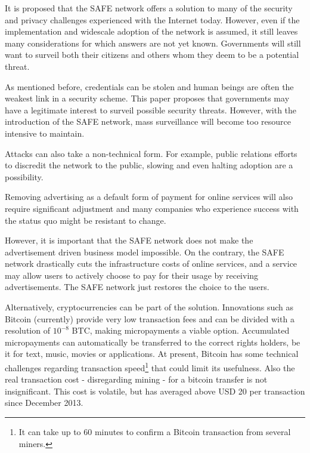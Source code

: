\documentclass[twocolumn,english]{article}
\begin{document}
It is proposed that the SAFE network offers a solution to many of
the security and privacy challenges experienced with the Internet
today. However, even if the implementation and widescale adoption
of the network is assumed, it still leaves many considerations for
which answers are not yet known. Governments will still want to surveil
both their citizens and others whom they deem to be a potential threat.

As mentioned before, credentials can be stolen and human beings are often the weakest link in a security scheme.  This paper proposes that governments may have a legitimate interest to surveil possible security threats.  However, with the introduction of the SAFE network, mass surveillance will become too resource intensive to maintain.

Attacks can also take a non-technical
form. For example, public relations efforts to discredit the network
to the public, slowing and even halting adoption are a possibility.

Removing advertising as a default form of payment for online services will
also require significant adjustment and many companies who experience success with the status quo might be resistant to
change.

However, it is important that the SAFE network does not make the advertisement driven business model impossible.  On the contrary, the SAFE network drastically cuts the infrastructure costs of online services, and a service may allow users to actively choose to pay for their usage by receiving advertisements.  The SAFE network just restores the choice to the users.


Alternatively, cryptocurrencies can be part of the solution. Innovations such as Bitcoin (currently) provide very low transaction fees and can be divided with a resolution of $10^{-8}$ BTC, making micropayments a viable option. Accumulated micropayments can automatically be transferred to the correct rights holders, be it for text, music, movies or applications. At present, Bitcoin has some technical challenges regarding transaction speed\footnote{It can take up to 60 minutes to confirm a Bitcoin transaction from several miners.} that could limit its usefulness. Also the real transaction cost - disregarding mining - for a bitcoin transfer is not insignificant. This cost is volatile, but has averaged above USD 20 per transaction since December 2013\cite{blockchain14}.
\end{document}
